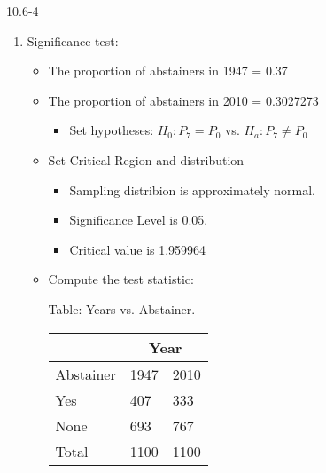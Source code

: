 \begin{exsol@solution}{10.6-4}

  	  \begin{enumerate}
	 \item Significance test:


\begin{itemize}
\item The proportion of abstainers in 1947 = 0.37
\item The proportion of abstainers in 2010 = 0.3027273
  \begin{itemize}
  \item Set hypotheses: $H_0: P_7 = P_0$ vs. $H_a: P_7 \ne P_0$
  \end{itemize}

\item Set Critical Region and distribution

  \begin{itemize}
  \item Sampling distribion is approximately normal.
  \item Significance Level is 0.05.
  \item Critical value is 1.959964
  \end{itemize}

\item Compute the test statistic:

\begin{minipage}[h]{6cm}

Table: Years vs. Abstainer.



      \begin{tabular}{@{} p{2.5cm} p{1cm} p{1cm} @{}} \hline %
     &  \multicolumn{2}{c}{Year } \\ \hline
     Abstainer   & 1947 & 2010 \\ \hline
     Yes   & 407 & 333 \\
     None          & 693 & 767 \\ \hline
     Total        & 1100 & 1100 \\ \hline
   \end{tabular}

\end{minipage} \hfill
\begin{minipage}[h]{6cm}


\end{minipage}
\end{itemize}
\end{enumerate}
\end{exsol@solution}
